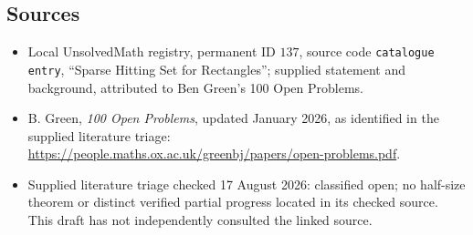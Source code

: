 \documentclass[11pt]{article}
\begin{document}
\subsection{Sources}
\begin{itemize}
\item Local UnsolvedMath registry, permanent ID $137$, source code \texttt{catalogue entry}, ``Sparse Hitting Set for Rectangles''; supplied statement and background, attributed to Ben Green's 100 Open Problems.
\item B. Green, \emph{100 Open Problems}, updated January 2026, as identified in the supplied literature triage: \url{https://people.maths.ox.ac.uk/greenbj/papers/open-problems.pdf}.
\item Supplied literature triage checked 17 August 2026: classified open; no half-size theorem or distinct verified partial progress located in its checked source. This draft has not independently consulted the linked source.
\end{itemize}
\end{document}

